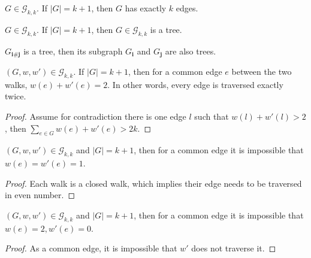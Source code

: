 
\begin{lemma}\label{lem:exactly_k_edges}
    \notready
    $G \in \mathcal{G}_{k, k}$. If $|G| = k + 1$, then $G$ has exactly $k$ edges.
\end{lemma}

\begin{lemma}\label{lem:G_is_tree}
    \notready
    $G \in \mathcal{G}_{k, k}$. If $|G| = k + 1$, then $G \in \mathcal{G}_{k, k}$ is a tree.
\end{lemma}


\begin{lemma}\label{lem:subgraph_of_tree}
    \notready
    $G_{\mathbf{i} \# \mathbf{j}}$ is a tree, then its subgraph $G_{\mathbf{i}}$ and $G_{\mathbf{j}}$ are also trees.
\end{lemma}


\begin{lemma}\label{lem:traverse_exactly_twice}
    \notready
    $(G, w, w') \in \mathcal{G}_{k, k}$. If $|G| = k + 1$, then for a common edge $e$ between the two walks, $w(e) + w'(e) =2$. In other words, every edge is traversed exactly twice.
    \begin{proof}
        Assume for contradiction there is one edge $l$ such that $w(l) + w'(l) > 2$, then $\sum_{e \in G} w(e) + w'(e) > 2k$.
    \end{proof}
\end{lemma}


\begin{lemma}\label{lem:i_j_traverse_once}
    \notready
     $(G, w, w') \in \mathcal{G}_{k, k}$ and $|G| = k + 1$, then for a common edge it is impossible that $w(e) = w'(e) = 1$.
     \begin{proof}
       Each walk is a closed walk, which implies their edge needs to be traversed in even number.
     \end{proof}
\end{lemma}


\begin{lemma}\label{lem:walk_i_traverse_twice}
    \notready
     $(G, w, w') \in \mathcal{G}_{k, k}$ and $|G| = k + 1$, then for a common edge it is impossible that $w(e) = 2, w'(e) = 0$.
     \begin{proof}
      As a common edge, it is impossible that $w'$ does not traverse it.
     \end{proof}
\end{lemma}


